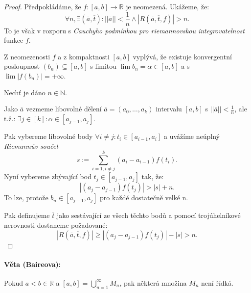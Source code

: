 \documentclass[10pt,a4paper]{article}
\newcommand{\N}{{\mathbb{N}}}
\newcommand{\R}{{\mathbb{R}}}
\begin{document}
\begin{proof}
    Předpokládáme, že $f : [a, b] \to \R$ je neomezená. 
    Ukážeme, že:
    \[
        \forall n, \exists (\overline{a}, \overline{t}): ||\overline{a}|| < \frac{1}{n} \land |R(\overline{a}, \overline{t}, f)| > n.
    \] 
    To je však v rozporu s \textit{Cauchyho podmínkou pro riemannovskou integrovatelnost} funkce $f$.

    Z neomezenosti $f$ a z kompaktnosti $[a, b]$ vyplývá, že existuje konvergentní posloupnost $(b_n) \subseteq [a, b]$ s limitou $\lim b_n = \alpha \in [a, b]$ a s $\lim |f (b_n)| = +\infty$. 
    
    Nechť je dáno $n \in \N$. 
    
    Jako $\overline{a}$ vezmeme libovolné dělení $\overline{a} = (a_0, \dots, a_k)$ intervalu $[a, b]$ s $||\overline{a}|| < \frac 1n$, ale
    t.ž.: $\exists j \in [k] : \alpha \in [a_{j-1}, a_j]$. 
    
    Pak vybereme libovolné body $\forall i \neq j: t_i \in [a_{i-1}, a_i]$ a uvážíme
    neúplný \textit{Riemannův součet}
    \[
        s:= \sum_{i=1, i\neq j}^{k}(a_i - a_{i-1})f(t_i).
    \]
    Nyní vybereme zbývající bod $t_j \in [a_{j-1}, a_j]$ tak, že: \[
        |(a_j - a_{j-1}) f(t_j) | > |s| + n.
    \] To lze, protože $b_n\in [a_{j-1}, a_j]$ pro každé dostatečně velké n. 
    
    Pak definujeme $\overline{t}$ jako sestávající ze všech těchto bodů a pomocí trojúhelníkové
    nerovnosti dostaneme požadované: \[
        |R(\overline{a}, \overline{t}, f )| \geq |(a_j - a_{j-1})f(t_j)| - |s| > n.
    \]
    

\end{proof}

\paragraph*{Věta (Baireova):} Pokud $a < b\in \R$ a $\displaystyle [a, b] = \bigcup_{n=1}^{\infty} M_n$, pak některá množina $M_n$ není řídká.
\end{document}
